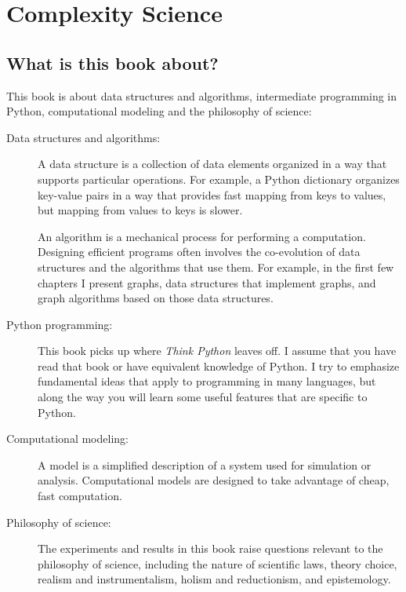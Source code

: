 \documentclass[10pt]{book}
\begin{document}
\mainmatter

\chapter{Complexity Science}
\label{overview}

\section{What is this book about?}

This book is about data structures and algorithms, intermediate
programming in Python, computational modeling and the philosophy of
science:

\begin{description}

\item[Data structures and algorithms:] A data structure is a
  collection of data elements organized in a way that supports
  particular operations.  For example, a Python dictionary organizes
  key-value pairs in a way that provides fast mapping from keys to
  values, but mapping from values to keys is slower.

An algorithm is a mechanical process for performing a computation.
Designing efficient programs often involves the co-evolution of data
structures and the algorithms that use them.  For example, in the
first few chapters I present graphs, data structures that
implement graphs, and graph algorithms based on those data structures.

\item[Python programming:] This book picks up where {\em Think Python}
  leaves off.  I assume that you have read that book or have
  equivalent knowledge of Python.  I try to emphasize fundamental ideas
  that apply to programming in many languages, but along the way you
  will learn some useful features that are specific to Python.

\item[Computational modeling:] A model is a simplified
  description of a system used for simulation or analysis.
  Computational models are designed to take advantage of cheap, fast
  computation.

\item[Philosophy of science:] The experiments and results in this book
  raise questions relevant to the philosophy of science,
  including the nature of scientific laws, theory choice, realism and
  instrumentalism, holism and reductionism, and epistemology.

\end{description}
\end{document}
